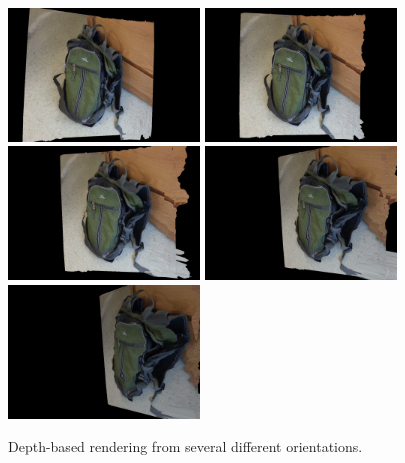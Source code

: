 \documentclass[conference]{acmsiggraph}
\begin{document}
\begin{figure}[ht]
  \centering
  \includegraphics[width=2in]{images/r1}
  \includegraphics[width=2in]{images/r2}
  \includegraphics[width=2in]{images/r3}
  \includegraphics[width=2in]{images/r4}
  \includegraphics[width=2in]{images/r5}
  \caption{Depth-based rendering from several different orientations.}
  \label{fig:rendering}
\end{figure}




\end{document}
